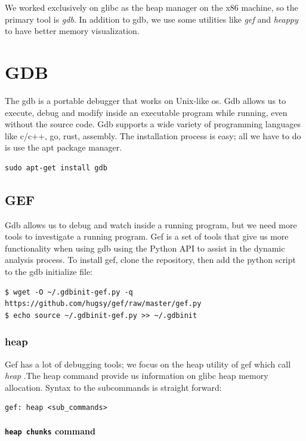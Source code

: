 \documentclass{masterthesis}
\newcommand*\libc{glibc}
\begin{document}
We worked exclusively on \libc{} as the heap manager on the x86 machine, so the primary tool is \emph{gdb}. In addition to gdb, we use some utilities like \emph{gef} and \emph{heappy} to have better memory visualization.


\section{GDB}
The gdb is a portable debugger that works on Unix-like os. Gdb allows us to execute, debug and modify inside an executable program while running, even without the source code. Gdb supports a wide variety of programming languages like c/c++, go, rust, assembly. The installation process is easy; all we have to do is use the apt package manager.
\begin{lstlisting}[frame=tlrb]
sudo apt-get install gdb
\end{lstlisting}

\subsection{GEF}
Gdb allows us to debug and watch inside a running program, but we need more tools to investigate a running program. Gef is a set of tools that give us more functionality when using gdb using the Python API to assist in the dynamic analysis process. To install gef, clone the repository, then add the python script to the gdb initialize file:
\begin{lstlisting}[frame=tlrb]
$ wget -O ~/.gdbinit-gef.py -q https://github.com/hugsy/gef/raw/master/gef.py
$ echo source ~/.gdbinit-gef.py >> ~/.gdbinit
\end{lstlisting}

\subsubsection{heap}
Gef has a lot of debugging tools; we focus on the heap utility of gef which call \emph{heap} .The heap command provide us information on \libc{} heap memory allocation. Syntax to the subcommands is straight forward:
\begin{lstlisting}[frame=tlrb]
gef: heap <sub_commands>
\end{lstlisting}

\paragraph{\lstinline{heap chunks} command}
\end{document}
